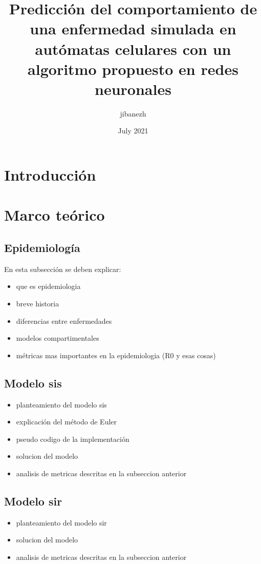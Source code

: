 \documentclass{article}
\title{Predicción del comportamiento de una enfermedad simulada en autómatas celulares con un algoritmo propuesto en redes neuronales}
\author{jibanezh }
\date{July 2021}
\begin{document}
\maketitle

\section{Introducción}

\section{Marco teórico}

\subsection{Epidemiología}
En esta subsección se deben explicar:
\begin{itemize}
    \item que es epidemiologia
    \item breve historia
    \item diferencias entre enfermedades
    \item modelos compartimentales
    \item métricas mas importantes en la epidemiologia (R0 y esas cosas)
\end{itemize}
\subsection{Modelo sis}
\begin{itemize}
    \item planteamiento del modelo sis 
    \item explicación del método de Euler 
    \item pseudo codigo de la implementación
    \item solucion del modelo 
    \item analisis de metricas descritas en la subseccion anterior
\end{itemize}
\subsection{Modelo sir}
\begin{itemize}
    \item planteamiento del modelo sir
    \item solucion del modelo 
    \item analisis de metricas descritas en la subseccion anterior
\end{itemize}

% 
% 
\end{document}
